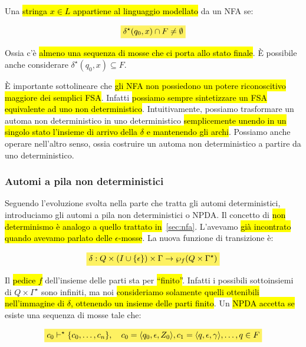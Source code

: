 \documentclass[a4paper,11pt,oneside]{article}
\theoremstyle{plain}
\theoremstyle{definition}
\theoremstyle{remark}
\newcommand{\mhl}[1]{\colorbox{hlcolor}{$\displaystyle #1$}}
\begin{document}
Una \hl{stringa $x \in L$ appartiene al linguaggio modellato} da un NFA se:

\begin{equation}
  \mhl{ \delta^\star(q_0, x) \cap F \neq \emptyset }
\end{equation}

Ossia c'è \hl{almeno una sequenza di mosse che ci porta allo stato finale}. È
possibile anche considerare $\delta^\star(q_0, x) \subseteq F$.

È importante sottolineare che \hl{gli NFA non possiedono un potere riconoscitivo
maggiore dei semplici FSA}\@. Infatti \hl{possiamo sempre sintetizzare un FSA
equivalente ad uno non deterministico}. Intuitivamente, possiamo trasformare un
automa non deterministico in uno deterministico \hl{semplicemente unendo in un
singolo stato l'insieme di arrivo della $\delta$ e mantenendo gli archi}.
Possiamo anche operare nell'altro senso, ossia costruire un automa non
deterministico a partire da uno deterministico.

\subsubsection{Automi a pila non deterministici}\label{sec:npda}

Seguendo l'evoluzione svolta nella parte che tratta gli automi deterministici,
introduciamo gli automi a pila non deterministici o NPDA\@. Il concetto di \hl{non
determinismo è analogo a quello trattato in}~\ref{sec:nfa}. L'avevamo \hl{già
incontrato quando avevamo parlato delle $\epsilon$-mosse}. La nuova funzione di
transizione è:

\begin{equation}
  \mhl{
    \delta: Q \times (I \cup \{\epsilon\}) \times \Gamma \to
      \wp_f(Q \times \Gamma^\star)
  }
\end{equation}

Il \hl{pedice $f$} dell'insieme delle parti sta per \hl{``finito''}. Infatti i possibili
sottoinsiemi di $Q \times \Gamma^\star$ sono infiniti, ma noi \hl{consideriamo
solamente quelli ottenibili nell'immagine di $\delta$, ottenendo un insieme
delle parti finito}. Un \hl{NPDA accetta se} esiste una sequenza di mosse tale che:

\begin{equation}
  \mhl{
    c_0 \vdash^\star \{c_0, \ldots, c_n \}, \quad
      c_0 = \langle q_0, \epsilon, Z_0 \rangle,
      c_1 = \langle q, \epsilon, \gamma \rangle, \ldots, q \in F
  }
\end{equation}
\end{document}
